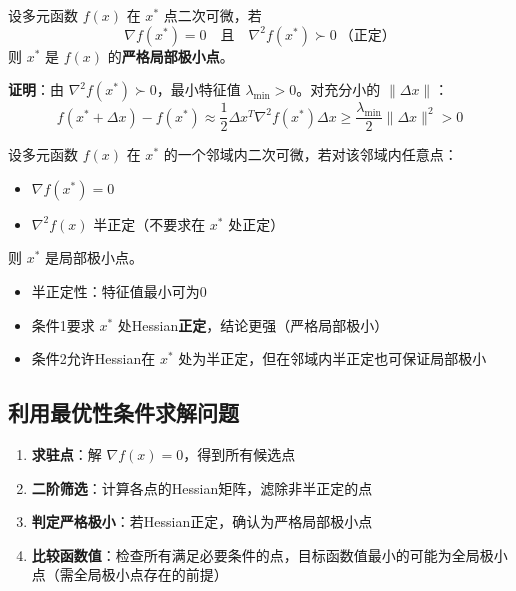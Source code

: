 \begin{theorem}[二阶充分条件 1]\label{thm:second-order-sufficient1}
设多元函数 $f(x)$ 在 $x^*$ 点二次可微，若
\[
\nabla f(x^*) = 0 \quad \text{且} \quad \nabla^2 f(x^*) \succ 0 \ \text{（正定）}
\]
则 $x^*$ 是 $f(x)$ 的\textbf{严格局部极小点}。
\end{theorem}

\textbf{证明}：由 $\nabla^2 f(x^*) \succ 0$，最小特征值 $\lambda_{\min} > 0$。对充分小的 $\|\Delta x\|$：
\[
f(x^* + \Delta x) - f(x^*) \approx \frac{1}{2} \Delta x^T \nabla^2 f(x^*) \Delta x \geq \frac{\lambda_{\min}}{2} \|\Delta x\|^2 > 0
\]

\begin{theorem}[二阶充分条件 2]\label{thm:second-order-sufficient2}
设多元函数 $f(x)$ 在 $x^*$ 的一个邻域内二次可微，若对该邻域内任意点：
\begin{itemize}
    \item $\nabla f(x^*) = 0$
    \item $\nabla^2 f(x)$ 半正定（不要求在 $x^*$ 处正定）
\end{itemize}
则 $x^*$ 是局部极小点。
\end{theorem}

\begin{notebox}[注意区别]
\begin{itemize}[itemsep=0.3em]
    \item 半正定性：特征值最小可为0
    \item 条件1要求 $x^*$ 处Hessian\textbf{正定}，结论更强（严格局部极小）
    \item 条件2允许Hessian在 $x^*$ 处为半正定，但在邻域内半正定也可保证局部极小
\end{itemize}
\end{notebox}

\subsection{利用最优性条件求解问题}

\begin{algobox}[求解步骤]
\begin{enumerate}[label=Step \arabic*:, leftmargin=2em]
    \item \textbf{求驻点}：解 $\nabla f(x) = 0$，得到所有候选点
    \item \textbf{二阶筛选}：计算各点的Hessian矩阵，滤除非半正定的点
    \item \textbf{判定严格极小}：若Hessian正定，确认为严格局部极小点
    \item \textbf{比较函数值}：检查所有满足必要条件的点，目标函数值最小的可能为全局极小点（需全局极小点存在的前提）
\end{enumerate}
\end{algobox}

